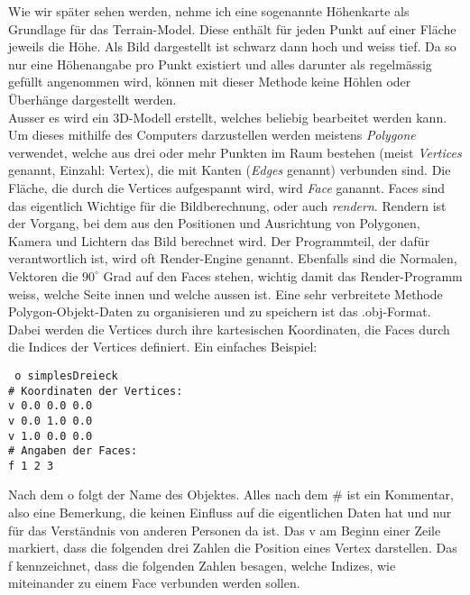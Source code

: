 \documentclass[12pt,twoside]{book}
\begin{document}
Wie wir sp\"ater sehen werden, nehme ich eine sogenannte H\"ohenkarte als Grundlage f\"ur das Terrain-Model. Diese enth\"alt f\"ur jeden Punkt auf einer Fl\"ache jeweils die H\"ohe. Als Bild dargestellt ist schwarz dann hoch und weiss tief. Da so nur eine H\"ohenangabe pro Punkt existiert und alles darunter als regelm\"assig gef\"ullt angenommen wird, k\"onnen mit dieser Methode keine H\"ohlen oder \"Uberh\"ange dargestellt werden. \\
Ausser es wird ein 3D-Modell erstellt, welches beliebig bearbeitet werden kann.\\
Um dieses mithilfe des Computers darzustellen werden meistens \textit{Polygone} verwendet, welche aus drei oder mehr Punkten im Raum bestehen (meist \textit{Vertices } genannt, Einzahl: Vertex), die mit Kanten (\textit{Edges} genannt) verbunden sind.
Die Fl\"ache, die durch die Vertices aufgespannt wird, wird \textit{Face} ganannt.
Faces sind das eigentlich Wichtige f\"ur die Bildberechnung, oder auch \textit{rendern}.
Rendern ist der Vorgang, bei dem aus den Positionen und Ausrichtung von Polygonen, Kamera und Lichtern das Bild berechnet wird. Der Programmteil, der daf\"ur verantwortlich ist, wird oft Render-Engine genannt. Ebenfalls sind die Normalen, Vektoren die \(90^\circ\) Grad auf den Faces stehen, wichtig damit das Render-Programm weiss, welche Seite innen und welche aussen ist.
Eine sehr verbreitete Methode Polygon-Objekt-Daten zu organisieren und zu speichern ist das .obj-Format.
Dabei werden die Vertices durch ihre kartesischen Koordinaten, die Faces durch die Indices der Vertices definiert.
Ein einfaches Beispiel:\\
\begin{addmargin}[13em]{1em}
\texttt{%
o simplesDreieck\\
\# Koordinaten der Vertices: \\
v 0.0 0.0 0.0 \\
v 0.0 1.0 0.0 \\
v 1.0 0.0 0.0 \\
\# Angaben der Faces: \\
f 1 2 3 \\
}
\end{addmargin}
Nach dem o folgt der Name des Objektes. Alles nach dem \# ist ein Kommentar, also eine Bemerkung, die keinen Einfluss auf die eigentlichen Daten hat und nur f\"ur das Verst\"andnis  von anderen Personen da ist.
Das v am Beginn einer Zeile markiert, dass die folgenden drei Zahlen die Position eines Vertex darstellen.
Das f kennzeichnet, dass die folgenden Zahlen besagen, welche Indizes, wie miteinander zu einem Face verbunden werden sollen.
\end{document}
